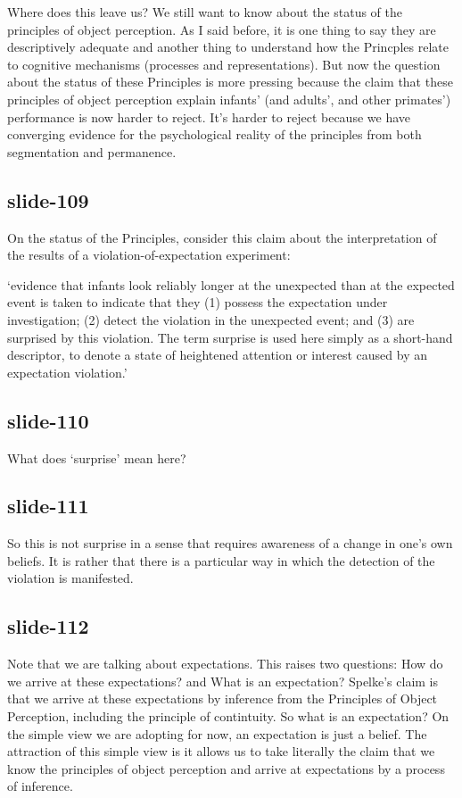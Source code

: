 \documentclass[12pt,\papersize]{extarticle}
\begin{document}
Where does this leave us?
We still want to know about the status of the principles of object perception.
As I said before, it is one thing to say they are descriptively adequate and another thing
to understand how the Princples relate to cognitive mechanisms (processes and 
representations).
But now the question about the status of these Principles is more pressing because 
the claim that these principles of object perception explain infants' (and adults', 
and other primates') performance is now harder to reject.
It's harder to reject because we have converging evidence for the psychological reality of 
the principles from both segmentation and permanence.
 
\subsection{slide-109}
On the status of the Principles, consider this claim about the interpretation of the 
results of a violation-of-expectation experiment:
 
‘evidence that infants look reliably longer at the unexpected than at the expected event is 
taken to indicate that they (1) possess the expectation under investigation; (2) detect the 
violation in the unexpected event; and (3) are surprised by this violation. The term 
surprise is used here simply as a short-hand descriptor, to denote a state of heightened 
attention or interest caused by an expectation violation.’ \citep[p.\ 168]{wang:2004_young}
 
\subsection{slide-110}
What does ‘surprise’ mean here?
 
\subsection{slide-111}
So this is not surprise in a sense that requires awareness of a change in one's own beliefs.
It is rather that there is a particular way in which the detection of the violation is 
manifested.
 
\subsection{slide-112}
Note that we are talking about expectations.
This raises two questions: How do we arrive at these expectations? and What is an 
expectation?
Spelke's claim is that we arrive at these expectations by inference from the Principles of 
Object Perception, including the principle of contintuity.
So what is an expectation?  
On the simple view we are adopting for now, an expectation is just a belief.
The attraction of this simple view is it allows us to take literally the claim that we know 
the principles of object perception and arrive at expectations by a process of inference.
 
\end{document}
